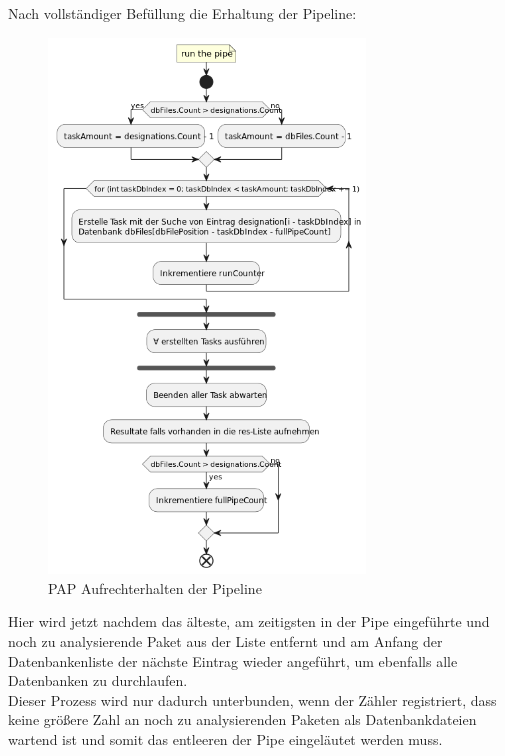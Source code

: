     \newpage
    Nach vollständiger Befüllung die Erhaltung der Pipeline:
    \begin{figure}[H]
        \centering
        \includegraphics[width=0.75\textwidth]{../pap/Case_B.png}
        \caption{\ac{PAP} Aufrechterhalten der Pipeline}
        \label{png:case_b}
    \end{figure}
    Hier wird jetzt nachdem das älteste, am zeitigsten in der Pipe eingeführte und noch zu analysierende Paket aus der Liste entfernt und am Anfang der Datenbankenliste der nächste Eintrag wieder angeführt, um ebenfalls alle Datenbanken zu durchlaufen.
    \\
    Dieser Prozess wird nur dadurch unterbunden, wenn der Zähler registriert, dass keine größere Zahl an noch zu analysierenden Paketen als Datenbankdateien wartend ist und somit das entleeren der Pipe eingeläutet werden muss.

